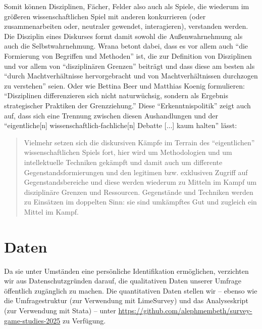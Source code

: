 \documentclass{scrartcl}
\begin{document}
Somit können Disziplinen, Fächer, Felder also auch als Spiele, die wiederum im größeren wissenschaftlichen Spiel mit anderen konkurrieren (oder zusammenarbeiten oder, neutraler gewendet, interagieren), verstanden werden.
Die Disziplin eines Diskurses formt damit sowohl die Außenwahrnehmung als auch die Selbstwahrnehmung.
Wrana betont dabei, dass es vor allem auch \enquote{die Formierung von Begriffen und Methoden} ist, die zur Definition von Disziplinen und vor allem von \enquote{disziplinären Grenzen} beiträgt und dass diese am besten als \enquote{durch Machtverhältnisse hervorgebracht und von Machtverhältnissen durchzogen zu verstehen} seien.\autocite[][S.~45]{wrana_inter-disziplinaritat_2017}
Oder wie Bettina Beer und Matthias Koenig formulieren:
\enquote{Disziplinen differenzieren sich nicht naturwüchsig, sondern als Ergebnis strategischer Praktiken der Grenzziehung.}\autocite[][S.~4]{beer_grenzziehungen_2009}
Diese \enquote{Erkenntnispolitik} zeigt auch auf, dass sich eine Trennung zwischen diesen Aushandlungen und der \enquote{eigentliche[n] wissenschaftlich-fachliche[n] Debatte [$\ldots$] kaum halten} lässt:\autocite[][S.~49]{wrana_inter-disziplinaritat_2017}

\begin{quote}
   Vielmehr setzen sich die diskursiven Kämpfe im Terrain des \enquote{eigentlichen} wissenschaftlichen Spiels fort, hier wird um Methodologien und um intellektuelle Techniken gekämpft und damit auch um differente Gegenstandsformierungen und den legitimen bzw. exklusiven Zugriff auf Gegenstandsbereiche und diese werden wiederum zu Mitteln im Kampf um disziplinäre Grenzen und Ressourcen.
   Gegenstände und Techniken werden zu Einsätzen im doppelten Sinn: sie sind umkämpftes Gut und zugleich ein Mittel im Kampf.\autocite[][S.~49--50]{wrana_inter-disziplinaritat_2017}
\end{quote}


\clearpage
\section*{Daten}
Da sie unter Umständen eine persönliche Identifikation ermöglichen, verzichten wir aus Datenschutzgründen darauf, die qualitativen Daten unserer Umfrage öffentlich zugänglich zu machen.
Die quantitativen Daten stellen wir -- ebenso wie die Umfragestruktur (zur Verwendung mit LimeSurvey) und das Analyseskript (zur Verwendung mit Stata) -- unter \url{https://github.com/alephmembeth/survey-game-studies-2025} zu Verfügung.
\end{document}
